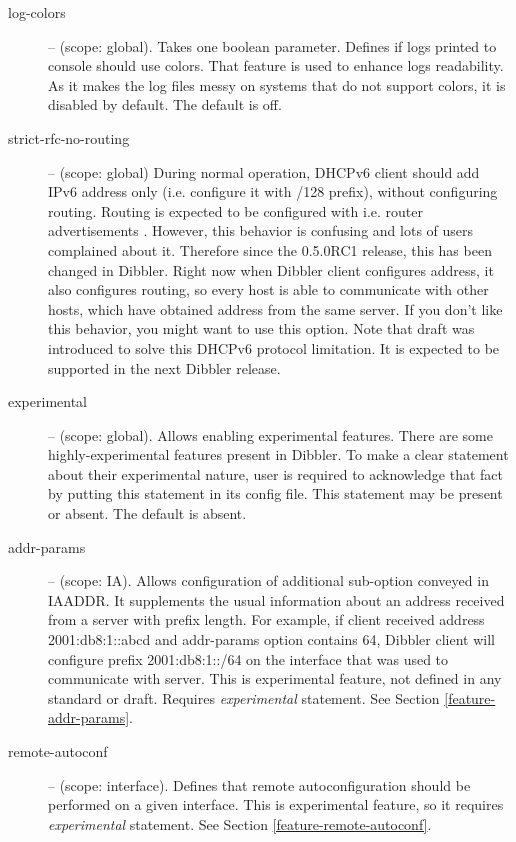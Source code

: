 \begin{description}
\item[log-colors] -- (scope: global). Takes one boolean parameter.
  Defines if logs printed to console should use colors. That feature
  is used to enhance logs readability.  As it makes the log files
  messy on systems that do not support colors, it is disabled by
  default. The default is off.

 \item[strict-rfc-no-routing] -- (scope: global) During normal
  operation, DHCPv6 client should add IPv6 address only
  (i.e. configure it with /128 prefix), without configuring routing.
  Routing is expected to be configured with i.e. router
  advertisements \cite{rfc4861}. However, this behavior is confusing
  and lots of users complained about it. Therefore since the 0.5.0RC1
  release, this has been changed in Dibbler. Right now when Dibbler
  client configures address, it also configures routing, so every host
  is able to communicate with other hosts, which have obtained address
  from the same server. If you don't like this behavior, you might
  want to use this option. Note that draft \cite{draft-route-option} was
  introduced to solve this DHCPv6 protocol limitation. It is expected
  to be supported in the next Dibbler release.

\item[experimental] -- (scope: global). Allows enabling experimental
features. There are some highly-experimental features present in
Dibbler. To make a clear statement about their experimental nature,
user is required to acknowledge that fact by putting this statement in
its config file. This statement may be present or absent. The default
is absent.

\item[addr-params] -- (scope: IA). Allows configuration of additional
sub-option conveyed in IAADDR. It supplements the usual information
about an address received from a server with prefix length. For
example, if client received address 2001:db8:1::abcd and addr-params
option contains 64, Dibbler client will configure prefix
2001:db8:1::/64 on the interface that was used to communicate with
server. This is experimental feature, not defined in any standard or
draft. Requires \emph{experimental} statement. See
Section \ref{feature-addr-params}.

\item[remote-autoconf] -- (scope: interface). Defines that remote
autoconfiguration should be performed on a given interface. This is
experimental feature, so it requires \emph{experimental}
statement. See Section \ref{feature-remote-autoconf}.


\end{description}
